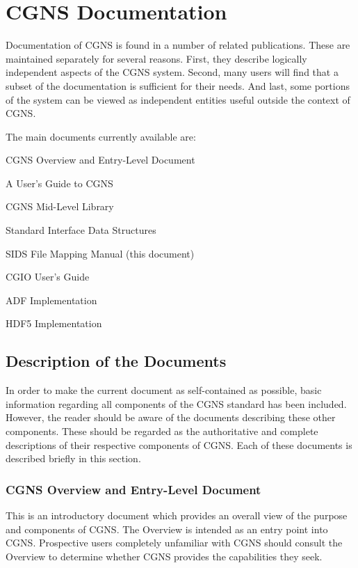 \section{CGNS Documentation}
\label{s:documentation}
\thispagestyle{plain}

Documentation of CGNS is found in a number of related
publications. These are maintained separately for several
reasons. First, they describe logically independent aspects of the CGNS
system. Second, many users will find that a subset of the documentation
is sufficient for their needs. And last, some portions of the system can
be viewed as independent entities useful outside the context of CGNS.

The main documents currently available are:

\begin{itemize*}
\item CGNS Overview and Entry-Level Document
\item A User's Guide to CGNS
\item CGNS Mid-Level Library
\item Standard Interface Data Structures
\item SIDS File Mapping Manual (this document)
\item CGIO User's Guide
\item ADF Implementation
\item HDF5 Implementation
\end{itemize*}

\subsection{Description of the Documents}

In order to make the current document as self-contained as possible,
basic information regarding all components of the CGNS standard has
been included. However, the reader should be aware of the documents
describing these other components. These should be regarded as the
authoritative and complete descriptions of their respective components
of CGNS. Each of these documents is described briefly in this section.

\subsubsection{CGNS Overview and Entry-Level Document}

This is an introductory document which provides an overall view of the
purpose and components of CGNS. The Overview is intended as an entry
point into CGNS. Prospective users completely unfamiliar with CGNS
should consult the Overview to determine whether CGNS provides the
capabilities they seek.


